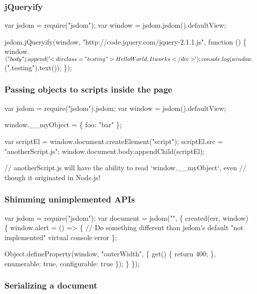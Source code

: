 \subsubsection*{j\+Queryify}


\begin{DoxyCode}
var jsdom = require("jsdom");
var window = jsdom.jsdom().defaultView;

jsdom.jQueryify(window, "http://code.jquery.com/jquery-2.1.1.js", function () \{
  window.$("body").append('<div class="testing">Hello World, It works</div>');

  console.log(window.$(".testing").text());
\});
\end{DoxyCode}


\subsubsection*{Passing objects to scripts inside the page}


\begin{DoxyCode}
var jsdom = require("jsdom").jsdom;
var window = jsdom().defaultView;

window.\_\_myObject = \{ foo: "bar" \};

var scriptEl = window.document.createElement("script");
scriptEl.src = "anotherScript.js";
window.document.body.appendChild(scriptEl);

// anotherScript.js will have the ability to read `window.\_\_myObject`, even
// though it originated in Node.js!
\end{DoxyCode}


\subsubsection*{Shimming unimplemented A\+P\+Is}


\begin{DoxyCode}
var jsdom = require("jsdom");
var document = jsdom("", \{
  created(err, window) \{
    window.alert = () => \{
      // Do something different than jsdom's default "not implemented" virtual console error
    \};

    Object.defineProperty(window, "outerWidth", \{
      get() \{ return 400; \},
      enumerable: true,
      configurable: true
    \});
  \}
\});
\end{DoxyCode}


\subsubsection*{Serializing a document}


